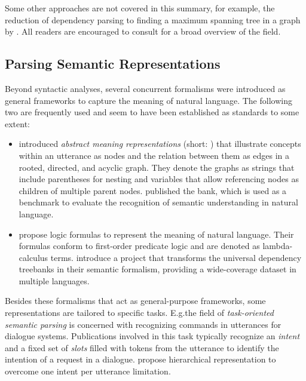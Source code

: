 \documentclass[../document.tex]{subfiles}
\begin{document}
    Some other approaches are not covered in this summary, for example, the reduction of dependency parsing to finding a maximum spanning tree in a graph by \citet{mcdonald-etal-2005-non}.
    All readers are encouraged to consult \citet{nivre2010dependency} for a broad overview of the field.

    \subsection{Parsing Semantic Representations}
    Beyond syntactic analyses, several concurrent formalisms were introduced as general frameworks to capture the meaning of natural language.
    The following two are frequently used and seem to have been established as standards to some extent:
    \begin{itemize}
        \item \citet{langkilde-knight-1998-generation} introduced \emph{abstract meaning representations} (short: ) that illustrate concepts within an utterance as nodes and the relation between them as edges in a rooted, directed, and acyclic graph. They denote the graphs as strings that include parentheses for nesting and variables that allow referencing nodes as children of multiple parent nodes. \citet{knight2021abstract} published the  bank, which is used as a benchmark to evaluate the recognition of semantic understanding in natural language.
        \item \citet{reddy-etal-2016-transforming} propose logic formulas to represent the meaning of natural language. Their formulas conform to first-order predicate logic and are denoted as lambda-calculus terms. \citet{reddy-etal-2017-universal} introduce a project that transforms the universal dependency treebanks in their semantic formalism, providing a wide-coverage dataset in multiple languages.
    \end{itemize}
    Besides these formalisms that act as general-purpose frameworks, some representations are tailored to specific tasks.
    E.g.\@ the field of \emph{task-oriented semantic parsing} is concerned with recognizing commands in utterances for dialogue systems.
    Publications involved in this task typically recognize an \emph{intent} and a fixed set of \emph{slots} filled with tokens from the utterance to identify the intention of a request in a dialogue.
    \citet{gupta-etal-2018-semantic-parsing} propose hierarchical representation to overcome one intent per utterance limitation.
\end{document}
